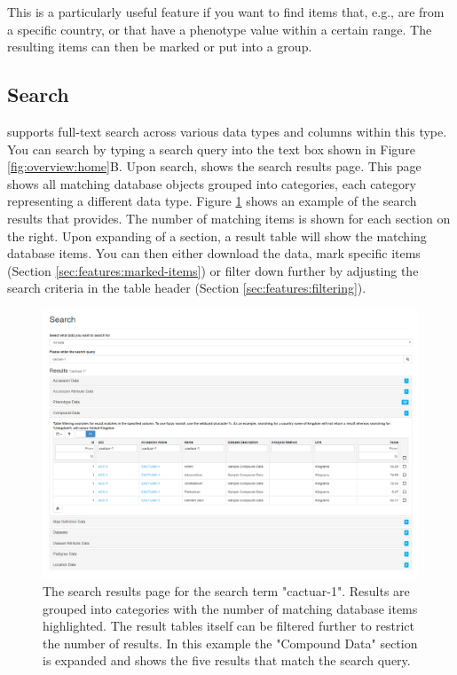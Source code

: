 This is a particularly useful feature if you want to find items that, e.g., are from a specific country, or that have a phenotype value within a certain range. The resulting items can then be marked or put into a group.

\subsection{Search}
\label{sec:features:search}
{\germinate} supports full-text search across various data types and columns within this type. You can search by typing a search query into the text box shown in Figure \ref{fig:overview:home}B. Upon search, {\germinate} shows the search results page. This page shows all matching database objects grouped into categories, each category representing a different data type. Figure \ref{fig:features:search} shows an example of the search results that {\germinate} provides. The number of matching items is shown for each section on the right. Upon expanding of a section, a result table will show the matching database items. You can then either download the data, mark specific items (\cf Section \ref{sec:features:marked-items}) or filter down further by adjusting the search criteria in the table header (\cf Section \ref{sec:features:filtering}).

\begin{figure}
	\centering
	\includegraphics[width=0.85\linewidth]{img/features/search.png}
	\caption{The search results page for the search term "cactuar-1". Results are grouped into categories with the number of matching database items highlighted. The result tables itself can be filtered further to restrict the number of results. In this example the "Compound Data" section is expanded and shows the five results that match the search query.}
	\label{fig:features:search}
\end{figure}

